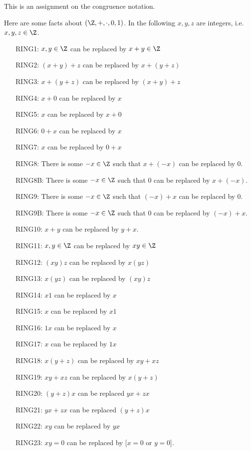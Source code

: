 \documentclass[a4paper,12pt]{article}
\begin{document}
\topmatter

This is an assignment on the congruence notation.

\newpage

Here are some facts about $(\Z, +, \cdot, 0, 1)$.
In the following $x,y,z$ are integers, i.e. $x,y,z \in \Z$.

\newcommand\LISTMARGIN{1in}
\begin{enumerate}[leftmargin=\LISTMARGIN]
\item[RING1:] $x,y \in \Z$ can be replaced by $x+y \in \Z$
\item[RING2:] $(x + y) + z$ can be replaced by $x + (y + z)$
\item[RING3:] $x + (y + z)$ can be replaced by $(x + y) + z$
\item[RING4:] $x + 0$ can be replaced by $x$
\item[RING5:] $x$ can be replaced by $x + 0$
\item[RING6:] $0 + x$ can be replaced by $x$
\item[RING7:] $x$ can be replaced by $0 + x$
\item[RING8:] There is some $-x \in \Z$ 
              such that $x + (-x)$ can be replaced by 0.
\item[RING8B:] There is some $-x \in \Z$ 
              such that 0 can be replaced by $x + (-x)$.
\item[RING9:] There is some $-x \in \Z$ 
              such that $(-x) + x$ can be replaced by 0.
\item[RING9B:] There is some $-x \in \Z$ 
              such that $0$ can be replaced by $(-x) + x$.
\item[RING10:] $x+y$ can be replaced by $y + x$.
\item[RING11:] $x, y \in \Z$ can be replaced by $xy \in \Z$
\item[RING12:] $(xy)z$ can be replaced by $x(yz)$
\item[RING13:] $x(yz)$ can be replaced by $(xy)z$
\item[RING14:] $x1$ can be replaced by $x$
\item[RING15:] $x$ can be replaced by $x1$
\item[RING16:] $1x$ can be replaced by $x$
\item[RING17:] $x$ can be replaced by $1x$
\item[RING18:] $x(y + z)$ can be replaced by $xy + xz$
\item[RING19:] $xy + xz$ can be replaced by $x(y + z)$
\item[RING20:] $(y+z)x$ can be replaced $yx + zx$
\item[RING21:] $yx+zx$ can be replaced $(y + z)x$
\item[RING22:] $xy$ can be replaced by $yx$
\item[RING23:] $xy=0$ can be replaced by [$x=0$ or $y=0$].
\end{enumerate}
\end{document}
